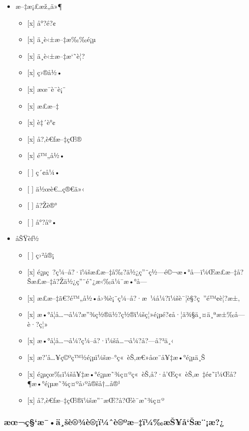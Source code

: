 \begin{itemize}
\tightlist
\item
  æ--‡æ¡£æž„ä»¶

  \begin{itemize}
  \tightlist
  \item
    {[}x{]} å°?é?¢
  \item
    {[}x{]} ä¸­è‹±æ--‡æ‰‰é¡µ
  \item
    {[}x{]} ä¸­è‹±æ--‡æ`˜è¦?
  \item
    {[}x{]} ç›®å½•
  \item
    {[}x{]} æœ¯è¯­è¡¨
  \item
    {[}x{]} æ­£æ--‡
  \item
    {[}x{]} è‡´è°¢
  \item
    {[}x{]} å?‚è€ƒæ--‡çŒ®
  \item
    {[}x{]} é™„å½•
  \item
    {[} {]} ç´¢å¼•
  \item
    {[} {]} ä½œè€\ldots ç®€ä»‹
  \item
    {[} {]} å?Žè®°
  \item
    {[} {]} å°?åº•
  \end{itemize}
\item
  åŠŸèƒ½

  \begin{itemize}
  \tightlist
  \item
    {[} {]} ç›²å®¡
  \item
    {[}x{]}
    é¡µç~?ç¼--å?·ï¼šæ­£æ--‡å‰?ä½¿ç''¨ç½---é©¬æ•°å­---ï¼Œæ­£æ--‡å?Šæ­£æ--‡å?Žä½¿ç''¨é˜¿æ‹‰ä¼¯æ•°å­---
  \item
    {[}x{]} æ­£æ--‡ã€?é™„å½•å›¾è¡¨ç¼--å?·æ~¼å¼?ï¼šè¯¦è§?ç~''é™¢è¦?æ±‚
  \item
    {[}x{]}
    æ•°å­¦å\ldots¬å¼?æ''¾ç½®ä½?ç½®ï¼šç¦»é¡µé?¢å·¦ä¾§ä¸¤ä¸ªæ±‰å­---è·?ç¦»
  \item
    {[}x{]} æ•°å­¦å\ldots¬å¼?ç¼--å?·ï¼šå\ldots¬å¼?å?---å?³ä¸‹
  \item
    {[}x{]} æ?'å\ldots¥ç©ºç™½é¡µï¼šæ--°ç«~èŠ‚æ€»åœ¨å¥‡æ•°é¡µä¸Š
  \item
    {[}x{]}
    é¡µçœ‰ï¼šå¥‡æ•°é¡µæ˜¾ç¤ºç«~èŠ‚å?·å'Œç«~èŠ‚æ~‡é¢˜ï¼Œå?¶æ•°é¡µæ˜¾ç¤ºå›ºå®šå†\ldots å®¹
  \item
    {[}x{]} å?‚è€ƒæ--‡çŒ®ï¼šæ''¯æŒ?å?Œè¯­æ˜¾ç¤º
  \end{itemize}
\end{itemize}

\subsubsection{æœ¬ç§`æ¯•ä¸šè®¾è®¡ï¼ˆè®ºæ--‡ï¼‰æŠ¥å`Šæ¨¡æ?¿}\label{uxe6ux153uxe7uxe6uxe4ux161uxe8uxbeuxe8uxefuxbcux2c6uxe8uxbauxe6uxefuxbcuxe6ux161uxe5ux161uxe6uxe6}

